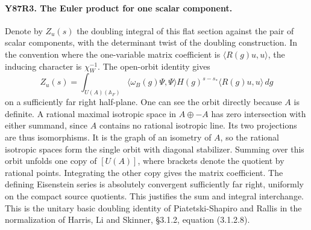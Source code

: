\paragraph{Y87R3. The Euler product for one scalar component.}
Denote by $Z_u(s)$ the doubling integral of this flat section against
the pair of scalar components, with the determinant twist of the
doubling construction. In the convention where the one-variable
matrix coefficient is $\langle R(g)u,u\rangle$, the inducing
character is $\chi_W^{-1}$. The open-orbit identity gives
\[
 Z_u(s)=\int_{U(A)(\mathbb A_F)}
    \langle\omega_B(g)\Psi,\Psi\rangle H(g)^{s-s_*}
                   \langle R(g)u,u\rangle\,dg
\]
on a sufficiently far right half-plane. One can see the orbit
directly because $A$ is definite. A rational maximal isotropic
space in $A\oplus-A$ has zero intersection with either summand,
since $A$ contains no rational isotropic line. Its two projections
are thus isomorphisms. It is the graph of an isometry of $A$, so
the rational isotropic spaces form the single orbit with diagonal
stabilizer. Summing over this orbit unfolds one copy of $[U(A)]$,
where brackets denote the quotient by rational points. Integrating
the other copy gives the matrix coefficient. The defining Eisenstein
series is absolutely convergent sufficiently far right, uniformly
on the compact source quotients. This justifies the sum and
integral interchange. This is the unitary basic doubling identity
of Piatetski-Shapiro and Rallis in the normalization of Harris,
Li and Skinner, \S3.1.2, equation (3.1.2.8).

